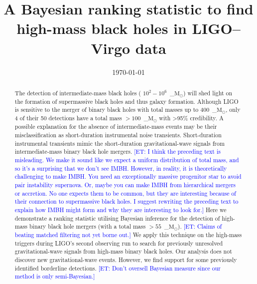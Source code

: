 \documentclass[%
 nofootinbib,
 amsmath,amssymb,
 aps,
 twocolumn
]{revtex4-2}
\newcommand{\mathcmd}[1]{{\sc \relax\ifmmode#1\else $#1$\fi}\xspace}
\newcommand{\msun}{\mathcmd{\text{M}_\odot}}
\newcommand{\et}[1]{\textcolor{blue}{[ET: #1]}}
\begin{document}
\title{A Bayesian ranking statistic to find high-mass black holes in LIGO--Virgo data}


% 


\date{\today}

\begin{abstract}
The detection of intermediate-mass black holes ( $10^2-10^6$~\msun) will shed light on the formation of supermassive black holes and thus galaxy formation. Although LIGO is sensitive to the merger of binary black holes with total masses up to $400$~\msun, only 4 of their 50 detections have a total mass $>100$~\msun with >95\% credibility. A possible explanation for the absence of intermediate-mass events may be their misclassification as short-duration instrumental noise transients. Short-duration instrumental transients mimic the short-duration gravitational-wave signals from intermediate-mass binary black hole mergers. 
\et{I think the preceding text is misleading. We make it sound like we expect a uniform distribution of total mass, and so it's a surprising that we don't see IMBH. However, in reality, it is theoretically challenging to make IMBH. You need an exceptionally massive progenitor star to avoid pair instability supernova. Or, maybe you can make IMBH from hierarchical mergers or accretion. No one expects them to be common, but they are  interesting because of their connection to supermassive black holes. I suggest rewriting the preceding text to explain how IMBH might form and why they are interesting to look for.}
Here we demonstrate a ranking statistic utilising Bayesian inference for the detection of high-mass binary black hole mergers (with a total mass $>55$~\msun). \et{Claims of beating matched filtering not yet borne out.} We apply this technique on the high-mass triggers during LIGO's second observing run to search for previously unresolved gravitational-wave signals from high-mass binary black holes. Our analysis does not discover new gravitational-wave events. However, we find support for some previously identified borderline detections.
\et{Don't oversell Bayesian measure since our method is only semi-Bayesian.}
\end{abstract}

\maketitle


\end{document}
